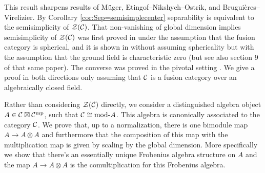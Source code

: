 \documentclass{amsart}
\begin{document}
This result sharpens results of M\"uger, Etingof--Nikshych--Ostrik, and Brugui\`eres--Virelizier.  By Corollary \ref{cor:Sep=semisimplecenter} separability is equivalent to the semisimplicity of $\mathcal Z(\mathcal C)$.  That non-vanishing of global dimension implies semisimplicity of $\mathcal Z(\mathcal C)$ was first proved in \cite[Prop. 3.10]{MR1966525} under the assumption that the fusion category is spherical, and it is shown in \cite[Thm. 2.15]{MR2183279} without assuming sphericality but with the assumption that the ground field is characteristic zero (but see also section 9 of that same paper).  The converse was proved in the pivotal setting \cite{MR3079759}.  We give a proof in both directions only assuming that $\mathcal C$ is a fusion category over an algebraically closed field.

Rather than considering $\mathcal Z(\mathcal C)$ directly, we consider a distinguished algebra object $A \in \mathcal C \boxtimes \mathcal C^{\mathrm{mp}}$, such that $\mathcal C \cong \text{mod-}A$. This algebra is canonically associated to the category $\mathcal C$. We prove that, up to a normalization, there is one bimodule map $A \rightarrow A \otimes A$ and furthermore that the composition of this map with the multiplication map is given by scaling by the global dimension.  More specifically we show that there's an essentially unique Frobenius algebra structure on $A$ and the map $A \rightarrow A \otimes A$ is the comultiplication for this Frobenius algebra.



\end{document}
